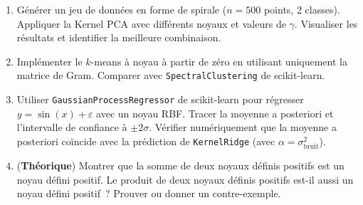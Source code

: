 \begin{exercice}
\begin{enumerate}
  \item G\'en\'erer un jeu de donn\'ees en forme de spirale
    ($n = 500$ points, 2 classes). Appliquer la Kernel PCA avec
    diff\'erents noyaux et valeurs de $\gamma$.
    Visualiser les r\'esultats et identifier la meilleure combinaison.
  \item Impl\'ementer le $k$-means \`a noyau \`a partir de z\'ero en
    utilisant uniquement la matrice de Gram. Comparer avec
    \texttt{SpectralClustering} de scikit-learn.
  \item Utiliser \texttt{GaussianProcessRegressor} de scikit-learn pour
    r\'egresser $y = \sin(x) + \varepsilon$ avec un noyau RBF.
    Tracer la moyenne a posteriori et l'intervalle de confiance \`a
    $\pm 2\sigma$. V\'erifier num\'eriquement que la moyenne a
    posteriori co\"incide avec la pr\'ediction de
    \texttt{KernelRidge} (avec $\alpha = \sigma^2_{\text{bruit}}$).
  \item (\textbf{Th\'eorique}) Montrer que la somme de deux noyaux
    d\'efinis positifs est un noyau d\'efini positif. Le produit de
    deux noyaux d\'efinis positifs est-il aussi un noyau d\'efini
    positif~? Prouver ou donner un contre-exemple.
\end{enumerate}
\end{exercice}
